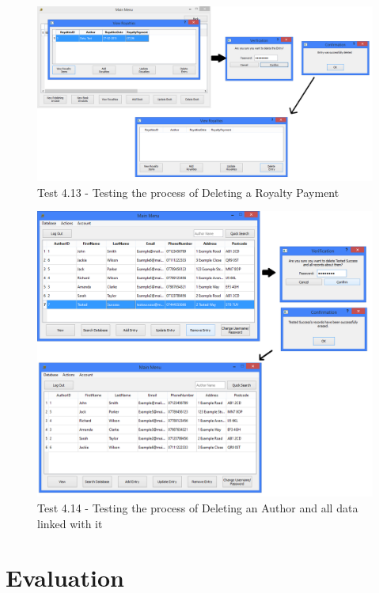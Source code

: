\begin{landscape}
\begin{figure}[H]
    \includegraphics[width=\textwidth]{./Testing/Evidence/Series4/DeleteRoyaltiesDataTest.png}
    \caption{Test 4.13 - Testing the process of Deleting a Royalty Payment}  \label{fig:DeleteRoyaltiesDataTest}
\end{figure}

\begin{figure}[H]
    \includegraphics[width=\textwidth]{./Testing/Evidence/Series4/DeleteAuthorDataTest.png}
    \caption{Test 4.14 - Testing the process of Deleting an Author and all data linked with it}  \label{fig:DeleteAuthorDataTest}
\end{figure}

\end{landscape}

\section{Evaluation}

